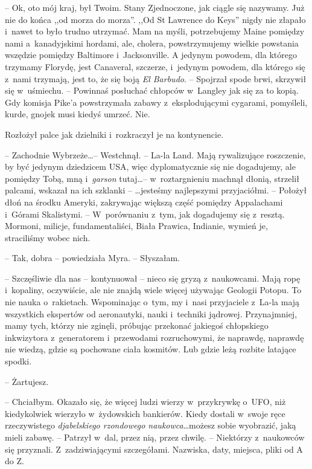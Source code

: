 \documentclass[oneside,polish,11pt,sfheadings]{mwbk}
\let\footnote=\endnote
\begin{document}
-- Ok, oto mój kraj, był Twoim.
Stany Zjednoczone, jak ciągle się nazywamy. Już nie do końca ,,od morza
do morza''. ,,Od St Lawrence do Keys'' nigdy nie złapało i~nawet to było
trudno utrzymać. Mam na myśli, potrzebujemy Maine pomiędzy nami a~kanadyjskimi hordami, ale, cholera, powstrzymujemy wielkie powstania
wszędzie pomiędzy Baltimore i~Jacksonville. A jedynym powodem, dla
którego trzymamy Florydę, jest Canaveral, szczerze, i~jedynym powodem,
dla którego się z~nami trzymają, jest to, że się boją \textit{El Barbudo}.
-- Spojrzał spode brwi, skrzywił się w~uśmiechu. -- Powinnaś posłuchać
chłopców w~Langley jak się za to kopią. Gdy komisja Pike'a powstrzymała
zabawy z~eksplodującymi cygarami, pomyśleli, kurde, gnojek musi kiedyś
umrzeć. Nie.

Rozłożył palce jak dzielniki i~rozkraczył je na kontynencie. 

-- Zachodnie Wybrzeże\ldots -- Westchnął. -- La-la Land\footnote{ zwyczajowa nazwa Los Angeles -- przyp.tłum.}. Mają rywalizujące roszczenie, by być jedynym dziedzicem
USA, więc dyplomatycznie się nie dogadujemy, ale pomiędzy Tobą, mną i~\textit{garson} tutaj\ldots -- w~roztargnieniu machnął dłonią, strzelił
palcami, wskazał na ich szklanki -- \ldots jesteśmy najlepszymi
przyjaciółmi. -- Położył dłoń na środku Ameryki, zakrywając większą część
pomiędzy Appalachami i~Górami Skalistymi. -- W~porównaniu z~tym, jak
dogadujemy się z~resztą. Mormoni, milicje, fundamentaliści, Biała
Prawica, Indianie, wymień je, straciliśmy wobec nich.

-- Tak, dobra -- powiedziała Myra. -- Słyszałam.

-- Szczęśliwie dla nas -- kontynuował -- nieco się gryzą z~naukowcami. Mają
ropę i~kopaliny, oczywiście, ale nie znajdą wiele więcej używając
Geologii Potopu. To nie nauka o~rakietach. Wspominając o~tym, my i~nasi
przyjaciele z~La-la mają wszystkich ekspertów od aeronautyki, nauki i~techniki jądrowej. Przynajmniej, mamy tych, którzy nie zginęli, próbując
przekonać jakiegoś chłopskiego inkwizytora z~generatorem i~przewodami
rozruchowymi, że naprawdę, naprawdę nie wiedzą, gdzie są pochowane ciała
kosmitów. Lub gdzie leżą rozbite latające spodki.

-- Żartujesz.

-- Chciałbym. Okazało się, że więcej ludzi wierzy w~przykrywkę o~UFO, niż
kiedykolwiek wierzyło w~żydowskich bankierów. Kiedy dostali w~swoje ręce
rzeczywistego \textit{djabelskiego rzondowego naukowca}\ldots możesz sobie
wyobrazić, jaką mieli zabawę. -- Patrzył w~dal, przez nią, przez chwilę.
-- Niektórzy z~naukowców się przyznali. Z~zadziwiającymi szczegółami.
Nazwiska, daty, miejsca, pliki od A do Z.
\end{document}
